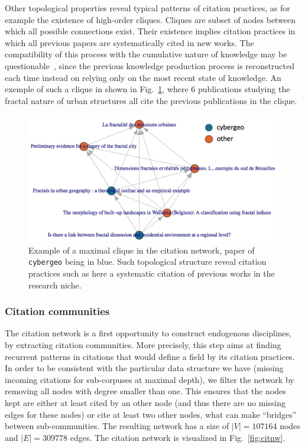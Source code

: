 \documentclass[10pt]{article}
\begin{document}
Other topological properties reveal typical patterns of citation practices, as for example the existence of high-order cliques. Cliques are subset of nodes between which all possible connections exist. Their existence implies citation practices in which all previous papers are systematically cited in new works. The compatibility of this process with the cumulative nature of knowledge may be questionable~\citep{pumain2005cumulativite}, since the previous knowledge production process is reconstructed each time instead on relying only on the most recent state of knowledge. An exemple of such a clique in shown in Fig.~\ref{fig:cliques}, where 6 publications studying the fractal nature of urban structures all cite the previous publications in the clique.



\begin{figure}
\includegraphics[width=\linewidth]{Fig4.jpg}
\caption{Example of a maximal clique in the citation network, paper of \texttt{cybergeo} being in blue. Such topological structure reveal citation practices such as here a systematic citation of previous works in the research niche.}
\label{fig:cliques}
\end{figure}



\subsubsection*{Citation communities}

The citation network is a first opportunity to construct endogenous disciplines, by extracting citation communities. More precisely, this step aims at finding recurrent patterns in citations that would define a field by its citation practices. In order to be consistent with the particular data structure we have (missing incoming citations for sub-corpuses at maximal depth), we filter the network by removing all nodes with degree smaller than one. This ensures that the nodes kept are either at least cited by an other node (and thus there are no missing edges for these nodes) or cite at least two other nodes, what can make ``bridges'' between sub-communities. The resulting network has a size of $\left|V\right| = 107164$ nodes and $\left|E\right| = 309778$ edges. The citation network is visualized in Fig.~\ref{fig:citnw}.
\end{document}
